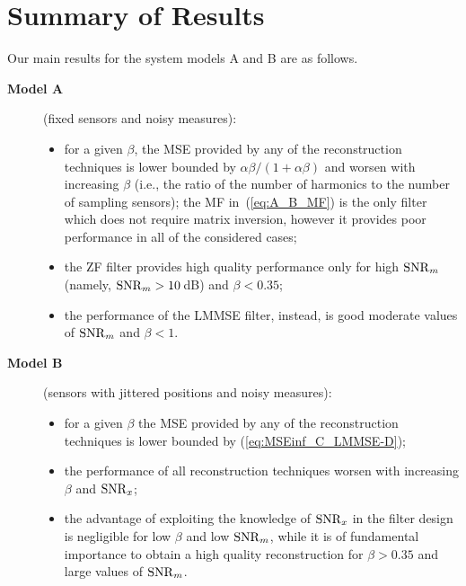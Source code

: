 \documentclass[final, a4paper]{IEEEtran}
\begin{document}
\section{Summary of Results}
\label{sec:summary}

Our main results for the system models A and B are as follows.
\begin{description}
\item[{\bf Model A}] \hspace{0.7cm} (fixed sensors and noisy measures):
\begin{itemize}
\item  for a given $\beta$, the MSE provided by any of the reconstruction techniques
is lower bounded by $\alpha\beta/(1+\alpha\beta)$ and worsen with increasing
$\beta$ (i.e., the ratio of the number of harmonics
 to the number of sampling sensors);
the MF in~(\ref{eq:A_B_MF}) is the only filter which
does not require matrix inversion,
however it provides poor performance in all of the considered cases;
\item the ZF filter
provides high quality performance only
for high ${\rm SNR}_m$ (namely, ${\rm SNR}_m>10$\,dB) and $\beta<0.35$;
\item the performance of the LMMSE filter, instead,
is good moderate values of ${\rm SNR}_m$ and $\beta<1$.
\end{itemize}

\item[{\bf  Model B}] \hspace{0.7cm} (sensors with jittered positions and noisy measures):
\begin{itemize}
\item for a given $\beta$ the MSE provided by any of the reconstruction techniques
is lower bounded by (\ref{eq:MSEinf_C_LMMSE-D});
\item the performance of all reconstruction techniques worsen with
increasing $\beta$ and ${\rm SNR}_x$;
\item the advantage of exploiting the knowledge of ${\rm SNR}_x$
in the filter design is negligible for low $\beta$ and low ${\rm SNR}_m$,
while it is of fundamental importance to obtain a high
quality reconstruction for $\beta>0.35$ and large values of ${\rm SNR}_m$.

\end{itemize}
\end{description}
\end{document}
